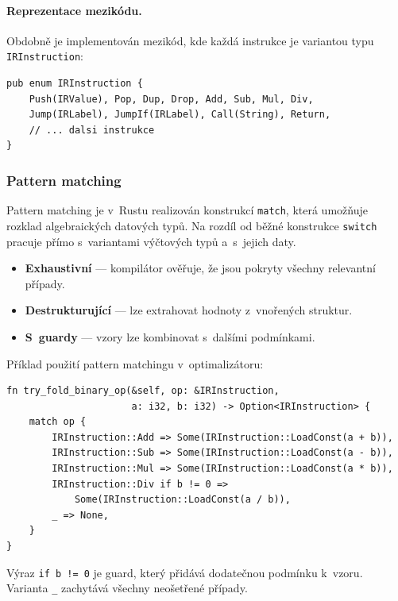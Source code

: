 \paragraph{Reprezentace mezikódu.}
Obdobně je implementován mezikód, kde každá instrukce je variantou
typu \texttt{IRInstruction}:

\begin{lstlisting}[basicstyle=\small\ttfamily]
pub enum IRInstruction {
    Push(IRValue), Pop, Dup, Drop, Add, Sub, Mul, Div,
    Jump(IRLabel), JumpIf(IRLabel), Call(String), Return,
    // ... dalsi instrukce
}
\end{lstlisting}


\subsubsection{Pattern matching}
\label{sec:rust-pattern}

Pattern matching je v~Rustu realizován konstrukcí \texttt{match}, která
umožňuje rozklad algebraických datových typů. Na rozdíl od běžné konstrukce
\texttt{switch} pracuje přímo s~variantami výčtových typů a~s~jejich daty.

\begin{itemize}
	\item \textbf{Exhaustivní} --- kompilátor ověřuje, že jsou pokryty všechny
	      relevantní případy.
	\item \textbf{Destrukturující} --- lze extrahovat hodnoty z~vnořených struktur.
	\item \textbf{S~guardy} --- vzory lze kombinovat s~dalšími podmínkami.
\end{itemize}

Příklad použití pattern matchingu v~optimalizátoru:

\begin{lstlisting}[basicstyle=\small\ttfamily]
fn try_fold_binary_op(&self, op: &IRInstruction,
                      a: i32, b: i32) -> Option<IRInstruction> {
    match op {
        IRInstruction::Add => Some(IRInstruction::LoadConst(a + b)),
        IRInstruction::Sub => Some(IRInstruction::LoadConst(a - b)),
        IRInstruction::Mul => Some(IRInstruction::LoadConst(a * b)),
        IRInstruction::Div if b != 0 =>
            Some(IRInstruction::LoadConst(a / b)),
        _ => None,
    }
}
\end{lstlisting}

Výraz \texttt{if b != 0} je guard, který přidává dodatečnou podmínku
k~vzoru. Varianta \texttt{\_} zachytává všechny neošetřené případy.


